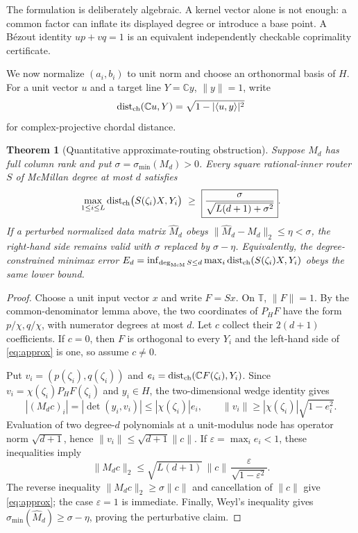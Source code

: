 \documentclass[11pt]{article}
\newtheorem{theorem}{Theorem}[section]
\theoremstyle{definition}\newtheorem{definition}[theorem]{Definition}\newtheorem{example}[theorem]{Example}
\theoremstyle{remark}\newtheorem{remark}[theorem]{Remark}\newtheorem{limitation}[theorem]{Limitation}
\newcommand{\C}{\mathbb C}\newcommand{\D}{\mathbb D}\newcommand{\T}{\mathbb T}
\newcommand{\norm}[1]{\lVert#1\rVert}\newcommand{\dd}{\,\mathrm d}
\begin{document}
The formulation is deliberately algebraic.  A kernel vector alone is not
enough: a common factor can inflate its displayed degree or introduce a base
point.  A B\'ezout identity $up+vq=1$ is an equivalent independently checkable
coprimality certificate.

We now normalize $(a_i,b_i)$ to unit norm and choose an orthonormal basis of
$H$.  For a unit vector $u$ and a target line $Y=\C y$, $\norm y=1$, write
\[
 \operatorname{dist}_{\rm ch}(\C u,Y)
 =\sqrt{1-|\langle u,y\rangle|^2}
\]
for complex-projective chordal distance.

\begin{theorem}[Quantitative approximate-routing obstruction]\label{thm:approx}
Suppose $M_d$ has full column rank and put
$\sigma=\sigma_{\min}(M_d)>0$.  Every square rational-inner router $S$ of
McMillan degree at most $d$ satisfies
\begin{equation}\label{eq:approx}
 \max_{1\le i\le L}\operatorname{dist}_{\rm ch}
       \bigl(S(\zeta_i)X,Y_i\bigr)
 \ \ge\ \boxed{\frac{\sigma}{\sqrt{L(d+1)+\sigma^2}}}.
\end{equation}
If a perturbed normalized data matrix $\widehat M_d$ obeys
$\norm{\widehat M_d-M_d}_2\le\eta<\sigma$, the right-hand side remains valid
with $\sigma$ replaced by $\sigma-\eta$.
Equivalently, the degree-constrained minimax error
$E_d=\inf_{\deg_{\mathrm{McM}} S\le d}\max_i\operatorname{dist}_{\rm ch}(S(\zeta_i)X,Y_i)$
obeys the same lower bound.
\end{theorem}

\begin{proof}
Choose a unit input vector $x$ and write $F=Sx$.  On $\T$, $\norm{F}=1$.
By the common-denominator lemma above, the two coordinates of $P_HF$ have the form
$p/\chi,q/\chi$, with numerator degrees at most $d$.  Let $c$ collect their
$2(d+1)$ coefficients.  If $c=0$, then $F$ is orthogonal to every $Y_i$ and
the left-hand side of \eqref{eq:approx} is one, so assume $c\ne0$.

Put $v_i=(p(\zeta_i),q(\zeta_i))$ and
$e_i=\operatorname{dist}_{\rm ch}(\C F(\zeta_i),Y_i)$.  Since
$v_i=\chi(\zeta_i)P_HF(\zeta_i)$ and $y_i\in H$, the two-dimensional wedge
identity gives
\[
 |(M_dc)_i|=|\det(y_i,v_i)|\le |\chi(\zeta_i)|e_i,
 \qquad
 \norm{v_i}\ge |\chi(\zeta_i)|\sqrt{1-e_i^2}.
\]
Evaluation of two degree-$d$ polynomials at a unit-modulus node has operator
norm $\sqrt{d+1}$, hence $\norm{v_i}\le\sqrt{d+1}\norm c$.  If
$\varepsilon=\max_i e_i<1$, these inequalities imply
\[
 \norm{M_dc}_2
 \le \sqrt{L(d+1)}\,\norm c\,
       \frac{\varepsilon}{\sqrt{1-\varepsilon^2}}.
\]
The reverse inequality $\norm{M_dc}_2\ge\sigma\norm c$ and cancellation of
$\norm c$ give \eqref{eq:approx}; the case $\varepsilon=1$ is immediate.
Finally, Weyl's inequality gives
$\sigma_{\min}(\widehat M_d)\ge\sigma-\eta$, proving the perturbative claim.
\end{proof}
\end{document}
